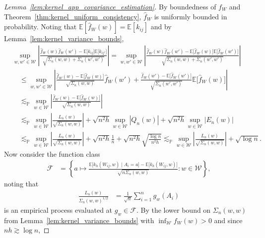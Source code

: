 \documentclass[11pt,lof]{puthesis}
\renewcommand{\P}{\ensuremath{\mathbb{P}}}
\newcommand{\E}{\ensuremath{\mathbb{E}}}
\newcommand{\cF}{\ensuremath{\mathcal{F}}}
\newcommand{\cW}{\ensuremath{\mathcal{W}}}
\theoremstyle{break}
\theoremstyle{proof}
\newtheorem{proof}{Proof}
\begin{document}
\begin{proof}[Lemma~\ref{lem:kernel_app_covariance_estimation}]
  By boundedness of $f_W$ and
  Theorem~\ref{thm:kernel_uniform_consistency},
  $\hat f_W$ is uniformly bounded in probability.
  Noting that
  $\E[\hat f_W(w)] = \E[k_{i j}]$
  and by Lemma~\ref{lem:kernel_variance_bounds},
  \begin{align*}
    &\sup_{w,w' \in \cW}
    \left|
    \frac{
      \hat f_W(w) \hat f_W(w')
    - \E\big[k_{i j}\big] \E\big[k_{i j'}\big]}
    {\sqrt{\Sigma_n(w,w) + \Sigma_n(w',w')}}
    \right|
    =
    \sup_{w,w' \in \cW}
    \left|
    \frac{
      \hat f_W(w) \hat f_W(w')
    - \E\big[\hat f_W(w)\big] \E\big[\hat f_W(w')\big]}
    {\sqrt{\Sigma_n(w,w) + \Sigma_n(w',w')}}
    \right| \\
    &\quad\leq
    \sup_{w,w' \in \cW}
    \left|
    \frac{\hat f_W(w) - \E\big[\hat f_W(w)\big]}
    {\sqrt{\Sigma_n(w,w)}}
    \hat f_W(w')
    + \frac{\hat f_W(w') - \E\big[\hat f_W(w')\big]}
    {\sqrt{\Sigma_n(w',w')}}
    \E\big[\hat f_W(w)]
    \right| \\
    &\quad\lesssim_\P
    \sup_{w \in \cW}
    \left|
    \frac{\hat f_W(w) - \E\big[\hat f_W(w)\big]}
    {\sqrt{\Sigma_n(w,w)}}
    \right| \\
    &\quad\lesssim_\P
    \sup_{w \in \cW}
    \left|
    \frac{L_n(w)}
    {\sqrt{\Sigma_n(w,w)}}
    \right|
    + \sqrt{n^2h} \sup_{w \in \cW} \left| Q_n(w) \right|
    + \sqrt{n^2h} \sup_{w \in \cW} \left| E_n(w) \right| \\
    &\quad\lesssim_\P
    \sup_{w \in \cW}
    \left|
    \frac{L_n(w)}
    {\sqrt{\Sigma_n(w,w)}}
    \right|
    + \sqrt{n^2h} \frac{1}{n}
    + \sqrt{n^2h} \sqrt{\frac{\log n}{n^2h}}
    \lesssim_\P
    \sup_{w \in \cW}
    \left|
    \frac{L_n(w)}
    {\sqrt{\Sigma_n(w,w)}}
    \right|
    + \sqrt{\log n}.
  \end{align*}
  Now consider the function class
  \begin{align*}
    \cF
    &=
    \left\{
      a \mapsto
      \frac{
        \E\big[k_h(W_{i j},w) \mid A_i = a \big]
      - \E\big[k_h(W_{i j},w) \big]}
      {\sqrt{n \Sigma_n(w,w)}}:
      w \in \cW
    \right\},
  \end{align*}
  noting that
  \begin{align*}
    \frac{L_n(w)}
    {\Sigma_n(w,w)^{1/2}}
    &=
    \frac{1}{\sqrt n}
    \sum_{i=1}^n
    g_w(A_i)
  \end{align*}
  is an empirical process evaluated at
  $g_w \in \cF$.
  By the lower bound on $\Sigma_n(w,w)$
  from Lemma~\ref{lem:kernel_variance_bounds}
  with $\inf_\cW f_W(w) > 0$ and since $n h \gtrsim \log n$,

\end{proof}
\end{document}

